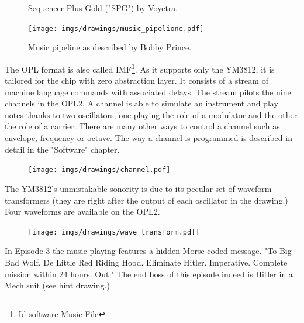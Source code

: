 \documentclass[book.tex]{subfiles}
\begin{document}
\begin{figure}[H]
\centering

\caption{Sequencer Plus Gold ("SPG") by Voyetra.}
\end{figure}

\begin{figure}[H]
\centering

 \texttt{[image: imgs/drawings/music\_pipelione.pdf]}
 \caption{Music pipeline as described by Bobby Prince.}
\end{figure}
The OPL format is also called IMF\footnote{Id software Music File}. As it supports only the YM3812, it is tailored for the chip with zero abstraction layer. It consists of a stream of machine language commands with associated delays. The stream pilots the nine channels in the OPL2. A channel is able to simulate an instrument and play notes thanks to two oscillators, one playing the role of a modulator and the other the role of a carrier. There are many other ways to control a channel such as envelope, frequency or octave. The way a channel is programmed is described in detail in the "Software" chapter.
\begin{figure}[H]
\centering
 \texttt{[image: imgs/drawings/channel.pdf]}
\end{figure}
\par
{}  The YM3812's unmistakable sonority is due to its pecular set of waveform transformers (they are right after the output of each oscillator in the drawing.) Four waveforms are available on the OPL2.
\par
\begin{figure}[H]
\centering
 \texttt{[image: imgs/drawings/wave\_transform.pdf]}
\end{figure}


 In Episode 3 the music playing features a hidden Morse coded message. "To Big Bad Wolf. De Little Red Riding Hood. Eliminate Hitler. Imperative. Complete mission within 24 hours. Out." The end boss of this episode indeed is Hitler in a Mech suit (see hint drawing.)
\end{document}
